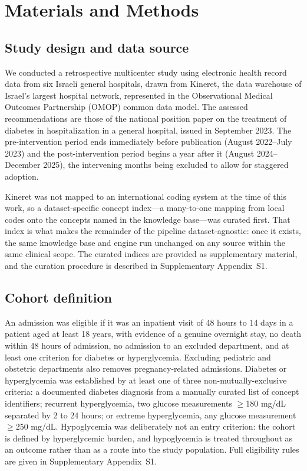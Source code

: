 \section{Materials and Methods}
\label{sec:methods}

\subsection{Study design and data source}

We conducted a retrospective multicenter study using electronic health record
data from six Israeli general hospitals, drawn from Kineret,\citep{rappoport2025kineret} the data warehouse of Israel's largest hospital
network, represented in the Observational Medical Outcomes Partnership (OMOP)
common data model. The assessed recommendations are those of the national
position paper on the treatment of diabetes in hospitalization in a general
hospital,\citep{hochberg2023inpatient} issued in September 2023. The
pre-intervention period ends immediately before publication (August 2022--July
2023) and the post-intervention period begins a year after it (August
2024--December 2025), the intervening months being excluded to allow for
staggered adoption.

Kineret was not mapped to an international coding system at the time of this
work, so a dataset-specific concept index---a many-to-one mapping from local
codes onto the concepts named in the knowledge base---was curated first. That
index is what makes the remainder of the pipeline dataset-agnostic: once it
exists, the same knowledge base and engine run unchanged on any source within
the same clinical scope. The curated indices are provided as supplementary
material, and the curation procedure is described in Supplementary
Appendix~S1.

\subsection{Cohort definition}
\label{sec:cohort-definition}

An admission was eligible if it was an inpatient visit of 48 hours to 14 days
in a patient aged at least 18 years, with evidence of a genuine overnight stay,
no death within 48 hours of admission, no admission to an excluded department,
and at least one criterion for diabetes or hyperglycemia. Excluding pediatric
and obstetric departments also removes pregnancy-related admissions. Diabetes or
hyperglycemia was established by at least one of three non-mutually-exclusive
criteria: a documented diabetes
diagnosis from a manually curated list of concept identifiers; recurrent
hyperglycemia, two glucose measurements $\geq$180 mg/dL separated by 2 to 24
hours; or extreme hyperglycemia, any glucose measurement $\geq$250 mg/dL.
Hypoglycemia was deliberately not an entry criterion: the cohort is defined by
hyperglycemic burden, and hypoglycemia is treated throughout as an outcome
rather than as a route into the study population. Full eligibility rules are
given in Supplementary Appendix~S1.

